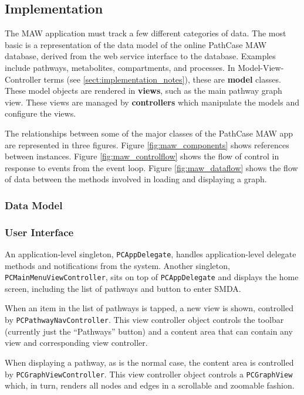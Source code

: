 \subsection{Implementation}
\label{sect:maw_implementation}

The MAW application must track a few different categories of data. The most
basic is a representation of the data model of the online PathCase MAW database,
derived from the web service interface to the database. Examples include
pathways, metabolites, compartments, and processes. In Model-View-Controller
terms (see \ref{sect:implementation_notes}), these are \textbf{model} classes.
These model objects are rendered in \textbf{views}, such as the main pathway
graph view.  These views are managed by \textbf{controllers} which manipulate
the models and configure the views.

The relationships between some of the major classes of the PathCase MAW app are
represented in three figures. Figure \ref{fig:maw_components} shows references
between instances. Figure \ref{fig:maw_controlflow} shows the flow of control in
response to events from the event loop. Figure \ref{fig:maw_dataflow} shows the
flow of data between the methods involved in loading and displaying a graph.

\subsubsection{Data Model}
\label{sect:maw_data_model}

\subsubsection{User Interface}
\label{sect:maw_ui}

An application-level singleton, \texttt{PCAppDelegate}, handles
application-level delegate methods and notifications from the system. Another
singleton, \texttt{PCMainMenuViewController}, sits on top of
\texttt{PCAppDelegate} and displays the home screen, including the list of
pathways and button to enter SMDA.

When an item in the list of pathways is tapped, a new view is shown, controlled
by \texttt{PCPathwayNavController}. This view controller object controls the
toolbar (currently just the ``Pathways'' button) and a content area that can
contain any view and corresponding view controller.

When displaying a pathway, as is the normal case, the content area is controlled
by \texttt{PCGraphViewController}. This view controller object controls a
\texttt{PCGraphView} which, in turn, renders all nodes and edges in a scrollable
and zoomable fashion.

